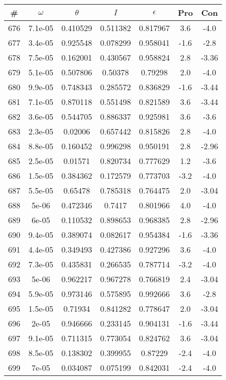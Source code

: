 \begin{table}
\begin{tabular}{c|c|c|c|c|c|c}
\# & $\omega$ & $\theta$ & $I$ & $\epsilon$ & Pro & Con\\
\hline
676 & 7.1e-05 & 0.410529 & 0.511382 & 0.817967 & 3.6 & -4.0\\
677 & 3.4e-05 & 0.925548 & 0.078299 & 0.958041 & -1.6 & -2.8\\
678 & 7.5e-05 & 0.162001 & 0.430567 & 0.958824 & 2.8 & -3.36\\
679 & 5.1e-05 & 0.507806 & 0.50378 & 0.79298 & 2.0 & -4.0\\
680 & 9.9e-05 & 0.748343 & 0.285572 & 0.836829 & -1.6 & -3.44\\
681 & 7.1e-05 & 0.870118 & 0.551498 & 0.821589 & 3.6 & -3.44\\
682 & 3.6e-05 & 0.544705 & 0.886337 & 0.925981 & 3.6 & -3.6\\
683 & 2.3e-05 & 0.02006 & 0.657442 & 0.815826 & 2.8 & -4.0\\
684 & 8.8e-05 & 0.160452 & 0.996298 & 0.950191 & 2.8 & -2.96\\
685 & 2.5e-05 & 0.01571 & 0.820734 & 0.777629 & 1.2 & -3.6\\
686 & 1.5e-05 & 0.384362 & 0.172579 & 0.773703 & -3.2 & -4.0\\
687 & 5.5e-05 & 0.65478 & 0.785318 & 0.764475 & 2.0 & -3.04\\
688 & 5e-06 & 0.472346 & 0.7417 & 0.801966 & 4.0 & -4.0\\
689 & 6e-05 & 0.110532 & 0.898653 & 0.968385 & 2.8 & -2.96\\
690 & 9.4e-05 & 0.389074 & 0.082617 & 0.954384 & -1.6 & -3.36\\
691 & 4.4e-05 & 0.349493 & 0.427386 & 0.927296 & 3.6 & -4.0\\
692 & 7.3e-05 & 0.435831 & 0.266535 & 0.787714 & -3.2 & -4.0\\
693 & 5e-06 & 0.962217 & 0.967278 & 0.766819 & 2.4 & -3.04\\
694 & 5.9e-05 & 0.973146 & 0.575895 & 0.992666 & 3.6 & -2.8\\
695 & 1.5e-05 & 0.71934 & 0.841282 & 0.778647 & 2.0 & -3.04\\
696 & 2e-05 & 0.946666 & 0.233145 & 0.904131 & -1.6 & -3.44\\
697 & 9.1e-05 & 0.711315 & 0.773054 & 0.824762 & 3.6 & -3.04\\
698 & 8.5e-05 & 0.138302 & 0.399955 & 0.87229 & -2.4 & -4.0\\
699 & 7e-05 & 0.034087 & 0.075199 & 0.842031 & -2.4 & -4.0\\

\end{tabular}
\end{table}
